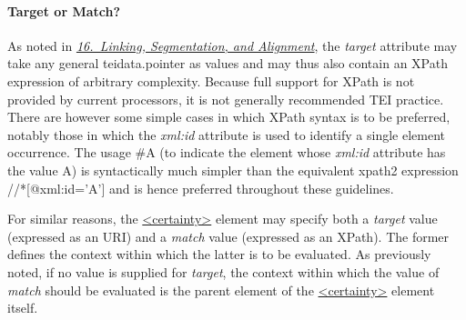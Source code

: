 \paragraph[{Target or Match?}]{Target or Match?}\par
As noted in \textit{\hyperref[SA]{16.\ Linking, Segmentation, and Alignment}}, the {\itshape target} attribute may take any general teidata.pointer as values and may thus also contain an XPath expression of arbitrary complexity. Because full support for XPath is not provided by current processors, it is not generally recommended TEI practice. There are however some simple cases in which XPath syntax is to be preferred, notably those in which the {\itshape xml:id} attribute is used to identify a single element occurrence. The usage \#A (to indicate the element whose {\itshape xml:id} attribute has the value A) is syntactically much simpler than the equivalent xpath2 expression //*[@xml:id='A'] and is hence preferred throughout these guidelines.\par
For similar reasons, the \hyperref[TEI.certainty]{<certainty>} element may specify both a {\itshape target} value (expressed as an URI) and a {\itshape match} value (expressed as an XPath). The former defines the context within which the latter is to be evaluated. As previously noted, if no value is supplied for {\itshape target}, the context within which the value of {\itshape match} should be evaluated is the parent element of the \hyperref[TEI.certainty]{<certainty>} element itself.\par
